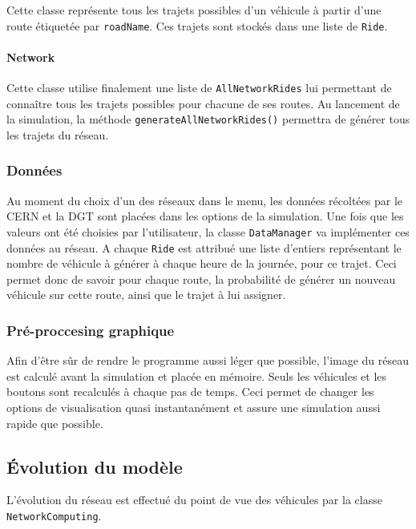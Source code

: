 \documentclass[a4paper,11pt, titlepage]{extarticle}
\begin{document}
Cette classe représente tous les trajets possibles d'un véhicule à partir d'une route étiquetée par \texttt{roadName}. Ces trajets sont stockés dans une liste de \texttt{Ride}.

\paragraph{Network}

Cette classe utilise finalement une liste de \texttt{AllNetworkRides} lui permettant de connaître tous les trajets possibles pour chacune de ses routes. Au lancement de la simulation, la méthode \texttt{generateAllNetworkRides()} permettra de générer tous les trajets du réseau.

\subsubsection{Données}

Au moment du choix d'un des réseaux dans le menu, les données récoltées par le CERN et la DGT sont placées dans les options de la simulation. Une fois que les valeurs ont été choisies par l'utilisateur, la classe \texttt{DataManager} va implémenter ces données au réseau. A chaque \texttt{Ride} est attribué une liste d'entiers représentant le nombre de véhicule à générer à chaque heure de la journée, pour ce trajet. Ceci permet donc de savoir pour chaque route, la probabilité de générer un nouveau véhicule sur cette route, ainsi que le trajet à lui assigner.

\subsubsection{Pré-proccesing graphique}

Afin d'être sûr de rendre le programme aussi léger que possible, l'image du réseau est calculé avant la simulation et placée en mémoire. Seuls les véhicules et les boutons sont recalculés à chaque pas de temps. Ceci permet de changer les options de visualisation quasi instantanément et assure une simulation aussi rapide que possible.

\newpage

\subsection{\label{sctEvolution}Évolution du modèle}

L'évolution du réseau est effectué du point de vue des véhicules par la classe \texttt{NetworkComputing}.
\end{document}
